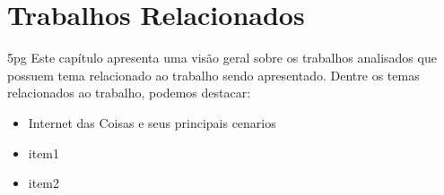 \chapter{Trabalhos Relacionados} 5pg
Este cap\'{i}tulo apresenta uma vis\~{a}o geral sobre os trabalhos analisados que possuem tema relacionado ao trabalho sendo apresentado. Dentre os temas relacionados ao trabalho, podemos destacar:

\begin{itemize}
\item Internet das Coisas e seus principais cenarios
\item item1
\item item2
\end{itemize}